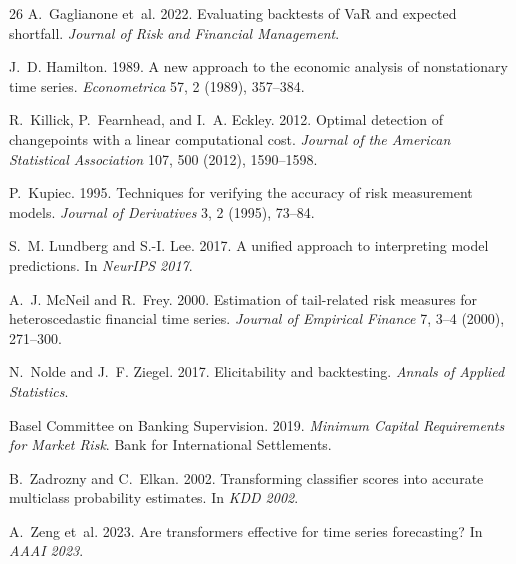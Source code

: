 \documentclass[sigconf, anonymous]{acmart}
\begin{document}
\begin{thebibliography}{26}
A.~Gaglianone et~al. 2022. Evaluating backtests of VaR and expected shortfall.
\textit{Journal of Risk and Financial Management}.

J.~D. Hamilton. 1989. A new approach to the economic analysis of nonstationary
time series. \textit{Econometrica} 57, 2 (1989), 357--384.

R.~Killick, P.~Fearnhead, and I.~A. Eckley. 2012. Optimal detection of
changepoints with a linear computational cost.
\textit{Journal of the American Statistical Association} 107, 500 (2012),
1590--1598.

P.~Kupiec. 1995. Techniques for verifying the accuracy of risk measurement
models. \textit{Journal of Derivatives} 3, 2 (1995), 73--84.

S.~M. Lundberg and S.-I. Lee. 2017. A unified approach to interpreting model
predictions. In \textit{NeurIPS 2017}.

A.~J. McNeil and R.~Frey. 2000. Estimation of tail-related risk measures for
heteroscedastic financial time series.
\textit{Journal of Empirical Finance} 7, 3--4 (2000), 271--300.

N.~Nolde and J.~F. Ziegel. 2017. Elicitability and backtesting.
\textit{Annals of Applied Statistics}.

Basel Committee on Banking Supervision. 2019.
\textit{Minimum Capital Requirements for Market Risk}.
Bank for International Settlements.

B.~Zadrozny and C.~Elkan. 2002. Transforming classifier scores into accurate
multiclass probability estimates. In \textit{KDD 2002}.

A.~Zeng et~al. 2023. Are transformers effective for time series forecasting?
In \textit{AAAI 2023}.

\end{thebibliography}
\end{document}

